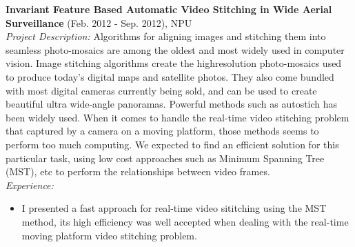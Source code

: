 \documentclass[margin]{res}
\begin{document}
\begin{resume}
                {\bf Invariant Feature Based Automatic Video Stitching in Wide Aerial Surveillance} \hfill (Feb. 2012 - Sep. 2012), NPU\\
                {\sl Project Description: } Algorithms for aligning images and stitching them into seamless photo-mosaics are among the
                oldest and most widely used in computer vision. Image stitching algorithms create the highresolution
                photo-mosaics used to produce today’s digital maps and satellite photos. They also
                come bundled with most digital cameras currently being sold, and can be used to create beautiful
                ultra wide-angle panoramas. Powerful methods such as autostich has been widely used. When it comes to handle the real-time video stitching problem that captured by a camera on a moving platform, those methods seems to perform too much computing. We expected to find an efficient solution for this particular task, using low cost approaches such as Minimum Spanning Tree (MST), etc to perform the relationships between video frames.\\
                {\sl Experience: }
                \begin{itemize} \itemsep -2pt
                \item I presented a fast approach for real-time video sititching using the MST method, its high efficiency was well accepted when dealing with the real-time moving platform video stitching problem.
                \end{itemize}


\end{resume}
\end{document}
